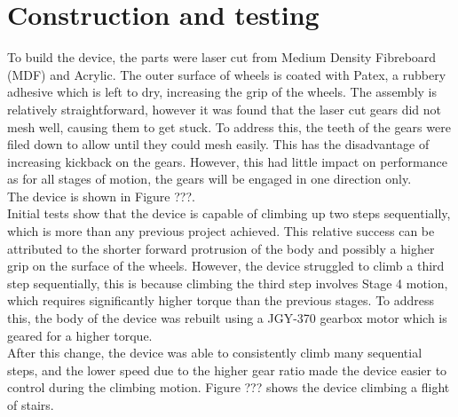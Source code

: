 \section{Construction and testing}

To build the device, the parts were laser cut from Medium Density Fibreboard (MDF) and Acrylic. The outer surface of wheels is coated with Patex, a rubbery adhesive which is left to dry, increasing the grip of the wheels. The assembly is relatively straightforward, however it was found that the laser cut gears did not mesh well, causing them to get stuck. To address this, the teeth of the gears were filed down to allow until they could mesh easily. This has the disadvantage of increasing kickback on the gears. However, this had little impact on performance as for all stages of motion, the gears will be engaged in one direction only.\\
The device is shown in Figure ???.
\\
Initial tests show that the device is capable of climbing up two steps sequentially, which is more than any previous project achieved. This relative success can be attributed to the shorter forward protrusion of the body and possibly a higher grip on the surface of the wheels. However, the device struggled to climb a third step sequentially, this is because climbing the third step involves Stage 4 motion, which requires significantly higher torque than the previous stages. To address this, the body of the device was rebuilt using a JGY-370 gearbox motor which is geared for a higher torque. \\
After this change, the device was able to consistently climb many sequential steps, and the lower speed due to the higher gear ratio made the device easier to control during the climbing motion. Figure ??? shows the device climbing a flight of stairs.

%
